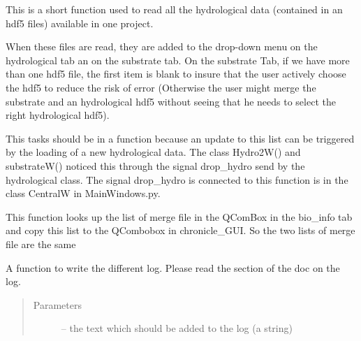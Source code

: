 \documentclass[letterpaper,10pt,english]{sphinxmanual}
\begin{document}
\begin{fulllineitems}
\begin{fulllineitems}
\end{fulllineitems}


\begin{fulllineitems}
\label{\detokenize{index:src_GUI.Main_windows_1.CentralW.update_hydro_hdf5_name}}
This is a short function used to read all the hydrological data (contained in an hdf5 files) available in
one project.

When these files are read, they are added to the drop-down menu on the hydrological tab an on the substrate tab.
On the substrate Tab, if we have more than one hdf5 file, the first item is blank to insure that the user
actively choose the hdf5 to reduce the risk of error (Otherwise the user might merge the substrate and
an hydrological hdf5 without seeing that he needs to select the right hydrological hdf5).

This tasks should be in a function because an update to this list can be triggered by the loading of a new
hydrological data. The class Hydro2W() and substrateW() noticed this through the signal drop\_hydro
send by the hydrological class. The signal drop\_hydro is connected to this function is in the class
CentralW in MainWindows.py.

\end{fulllineitems}


\begin{fulllineitems}
\label{\detokenize{index:src_GUI.Main_windows_1.CentralW.update_merge_for_chronicle}}
This function looks up the list of merge file in the QComBox in the bio\_info tab and copy this
list to the QCombobox in chronicle\_GUI. So the two lists of merge file are the same

\end{fulllineitems}


\begin{fulllineitems}
\label{\detokenize{index:src_GUI.Main_windows_1.CentralW.write_log}}
A function to write the different log. Please read the section of the doc on the log.
\begin{quote}\begin{description}
\item[{Parameters}] \leavevmode
{} -- the text which should be added to the log (a string)


\end{description}
\end{quote}
\end{fulllineitems}
\end{fulllineitems}
\end{document}
